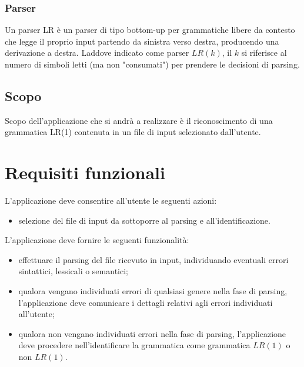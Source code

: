 \documentclass[12pt]{article}
\begin{document}
\subsubsection*{Parser}
Un parser LR è un parser di tipo bottom-up per grammatiche libere da contesto che legge il proprio input partendo da sinistra verso destra, producendo una derivazione a destra. Laddove indicato come parser $LR \left( k \right)$, il $k$ si riferisce al numero di simboli letti (ma non "consumati") per prendere le decisioni di parsing.

\subsection{Scopo}
Scopo dell'applicazione che si andrà a realizzare è il riconoscimento di una grammatica LR(1) contenuta in un file di input selezionato dall'utente. \par

\pagebreak

\section{Requisiti funzionali}

L'applicazione deve consentire all'utente le seguenti azioni:
\begin{itemize}
\item selezione del file di input da sottoporre al parsing e all'identificazione.
\end{itemize}
L'applicazione deve fornire le seguenti funzionalità:
\begin{itemize}
\item effettuare il parsing del file ricevuto in input, individuando eventuali errori sintattici, lessicali o semantici;
\item qualora vengano individuati errori di qualsiasi genere nella fase di parsing, l'applicazione deve comunicare i dettagli relativi agli errori individuati all'utente;
\item qualora non vengano individuati errori nella fase di parsing, l'applicazione deve procedere nell'identificare la grammatica come grammatica $LR \left( 1 \right)$ o non $LR \left( 1 \right)$.
\end{itemize}  
\end{document}
